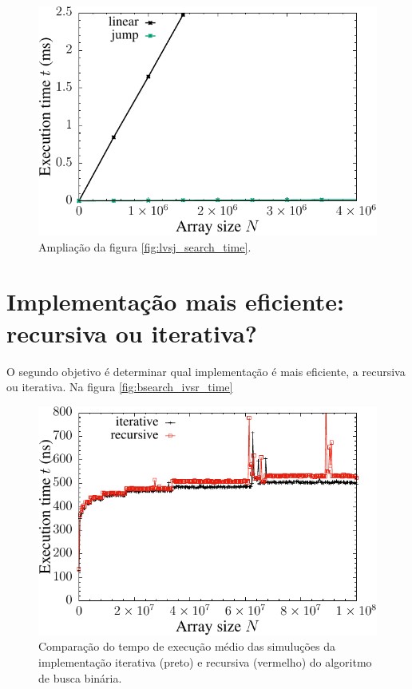 \begin{figure}[H]
  \centering
  \includegraphics[scale=1.2]{../plots/lvsj_search_time_zoom.pdf}
  \caption{Ampliação da figura \ref{fig:lvsj_search_time}.}
\end{figure} \label{fig:lvsj_search_time_zoom}


\section{Implementação mais eficiente: recursiva ou iterativa?}

O segundo objetivo é determinar qual implementação é mais eficiente, a recursiva ou iterativa. Na figura \ref{fig:bsearch_ivsr_time}

\begin{figure}[H]
  \centering
  \includegraphics[scale=1.2]{../plots/bsearch_itvsrec_time.pdf}
  \caption{Comparação do tempo de execução médio das simuluções da implementação iterativa (preto) e recursiva (vermelho) do algoritmo de busca binária.}
\end{figure} \label{fig:bsearch_ivsr_time}

